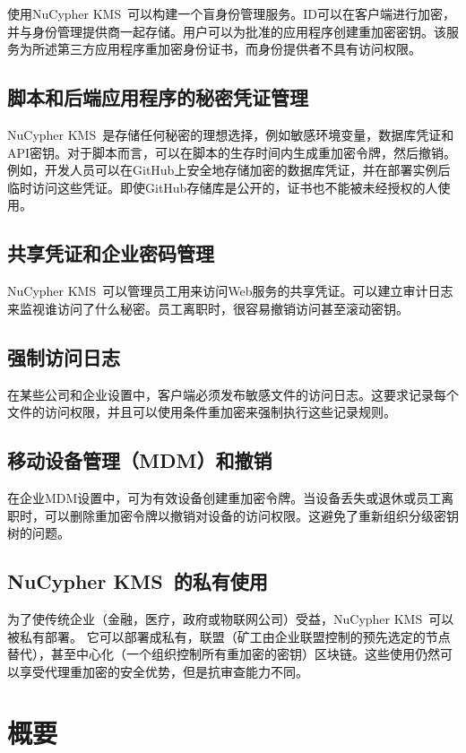 \documentclass[longbibliography,nofootinbib]{revtex4-1}
\newcommand{\kms}{NuCypher KMS}
\begin{document}
\begin{CJK*}{UTF8}{gbsn}
    使用\kms~可以构建一个盲身份管理服务。ID可以在客户端进行加密，并与身份管理提供商一起存储。用户可以为批准的应用程序创建重加密密钥。该服务为所述第三方应用程序重加密身份证书，而身份提供者不具有访问权限。

\subsection{脚本和后端应用程序的秘密凭证管理}

	\kms~是存储任何秘密的理想选择，例如敏感环境变量，数据库凭证和API密钥。对于脚本而言，可以在脚本的生存时间内生成重加密令牌，然后撤销。例如，开发人员可以在GitHub上安全地存储加密的数据库凭证，并在部署实例后临时访问这些凭证。即使GitHub存储库是公开的，证书也不能被未经授权的人使用。

\subsection{共享凭证和企业密码管理}
	\kms~可以管理员工用来访问Web服务的共享凭证。可以建立审计日志来监视谁访问了什么秘密。员工离职时，很容易撤销访问甚至滚动密钥。

\subsection{强制访问日志}

	在某些公司和企业设置中，客户端必须发布敏感文件的访问日志。这要求记录每个文件的访问权限，并且可以使用条件重加密来强制执行这些记录规则。

\subsection{移动设备管理（MDM）和撤销}
\label{sec:mdm}

    在企业MDM设置中，可为有效设备创建重加密令牌。当设备丢失或退休或员工离职时，可以删除重加密令牌以撤销对设备的访问权限。这避免了重新组织分级密钥树的问题。

\subsection{\kms~的私有使用}

	为了使传统企业（金融，医疗，政府或物联网公司）受益，\kms~可以被私有部署。 它可以部署成私有，联盟（矿工由企业联盟控制的预先选定的节点替代），甚至中心化（一个组织控制所有重加密的密钥）区块链。这些使用仍然可以享受代理重加密的安全优势，但是抗审查能力不同。

\section{概要}
	

\end{CJK*}
\end{document}

